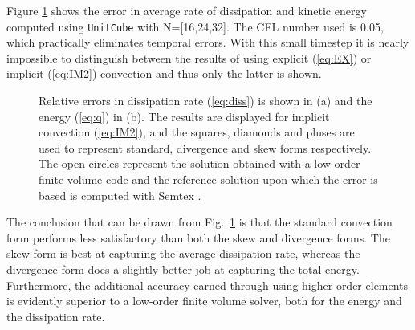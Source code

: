 Figure \ref{fig:dissipation} shows the error in average rate of dissipation and kinetic energy computed using {\fontsize{12pt}{12pt}\texttt{UnitCube}} with N=[16,24,32]. The CFL number used is 0.05, which practically eliminates temporal errors. With this small timestep it is nearly impossible to distinguish between the results of using explicit (\ref{eq:EX}) or implicit (\ref{eq:IM2}) convection and thus only the latter is shown.
\begin{figure}
  \centering
  \caption{Relative errors in dissipation rate (\ref{eq:diss}) is shown in (a) and the energy (\ref{eq:q}) in (b). The results are displayed for implicit convection (\ref{eq:IM2}), and the squares, diamonds and pluses are used to represent standard, divergence and skew forms respectively. The open circles represent the solution obtained with a low-order finite volume code and the reference solution upon which the error is based is computed with Semtex \cite{semtex}. }
  \label{fig:dissipation}
\end{figure}
The conclusion that can be drawn from Fig.~\ref{fig:dissipation} is that the standard convection form performs less satisfactory than both the skew and divergence forms. The skew form is best at capturing the average dissipation rate, whereas the divergence form does a slightly better job at capturing the total energy. Furthermore, the additional accuracy earned through using higher order elements is evidently superior to a low-order finite volume solver, both for the energy and the dissipation rate.



